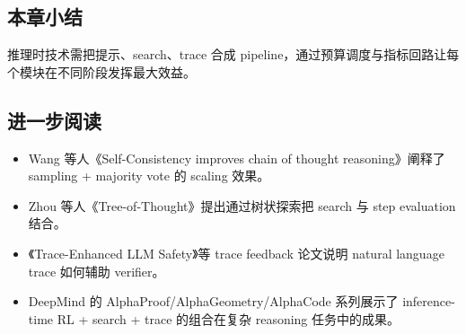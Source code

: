 \documentclass[a4paper]{article}
\begin{document}
\subsection{本章小结}
推理时技术需把提示、search、trace 合成 pipeline，通过预算调度与指标回路让每个模块在不同阶段发挥最大效益。

\subsection{进一步阅读}
\begin{itemize}
\item Wang 等人《Self-Consistency improves chain of thought reasoning》阐释了 sampling + majority vote 的 scaling 效果。
\item Zhou 等人《Tree-of-Thought》提出通过树状探索把 search 与 step evaluation 结合。
\item 《Trace-Enhanced LLM Safety》等 trace feedback 论文说明 natural language trace 如何辅助 verifier。
\item DeepMind 的 AlphaProof/AlphaGeometry/AlphaCode 系列展示了 inference-time RL + search + trace 的组合在复杂 reasoning 任务中的成果。
\end{itemize}
\end{document}
